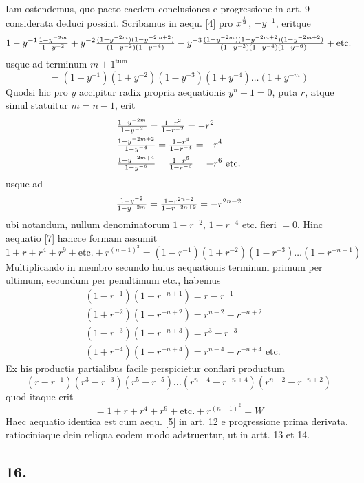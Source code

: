 \documentclass[twoside,12pt]{memoir}
\let\oldfrac\frac
\def\frac#1#2{\mathchoice{\tfrac{#1}{#2}}{\oldfrac{#1}{#2}}{\genfrac{}{}{}{2}{#1}{#2\mathstrut}}{\genfrac{}{}{}{3}{#1}{#2\mathstrut}}}
\begin{document}
Iam ostendemus, quo pacto eaedem conclusiones e progressione in art. 9 considerata deduci possint. Scribamus in aequ. [4] pro \(x^{\frac{1}{2}}\), \(-y^{-1}\), eritque\pagebreak%
\[1-y^{-1} \frac{1-y^{-2 m}}{1-y^{-2}}+y^{-2} \frac{(1-y^{-2 m})(1-y^{-2 m+2})}{(1-y^{-2})(1-y^{-4})}-y^{-3} \frac{(1-y^{-2 m})(1-y^{-2 m+2})(1-y^{-2 m+2})}{(1-y^{-2})(1-y^{-4})(1-y^{-6})}+\text{etc.}\]
usque ad terminum \(m+1^{\text{tum }}\)
\[=(1-y^{-1})(1+y^{-2})(1-y^{-3})(1+y^{-4}) \ldots(1 \pm y^{-m})\tag{7}\]
Quodsi hic pro \(y\) accipitur radix propria aequationis \(y^{n}-1=0\), puta \(r\), atque simul statuitur \(m=n-1\), erit
\[\begin{aligned}
& \frac{1-y^{-2 m}}{1-y^{-2}}=\frac{1-r^{2}}{1-r^{-2}}=-r^{2} \\
& \frac{1-y^{-2 m+2}}{1-y^{-4}}=\frac{1-r^{4}}{1-r^{-4}}=-r^{4} \\
& \frac{1-y^{-2 m+4}}{1-y^{-6}}=\frac{1-r^{6}}{1-r^{-6}}=-r^{6} \text{ etc.}
\end{aligned}\]
usque ad
\[\frac{1-y^{-2}}{1-y^{-2 m}}=\frac{1-r^{2 n-2}}{1-r^{-2 n+2}}=-r^{2 n-2}\]
ubi notandum, nullum denominatorum \(1-r^{-2}\), \(1-r^{-4}\) etc. fieri \(=0\). Hinc aequatio [7] hancce formam assumit
\[1+r+r^{4}+r^{9}+\text{etc.}+r^{(n-1)^{2}}=(1-r^{-1})(1+r^{-2})(1-r^{-3}) \ldots(1+r^{-n+1})\]
Multiplicando in membro secundo huius aequationis terminum primum per ultimum, secundum per penultimum etc., habemus
\[\begin{aligned}
& (1-r^{-1})(1+r^{-n+1})=r-r^{-1} \\
& (1+r^{-2})(1-r^{-n+2})=r^{n-2}-r^{-n+2} \\
& (1-r^{-3})(1+r^{-n+3})=r^{3}-r^{-3} \\
& (1+r^{-4})(1-r^{-n+4})=r^{n-4}-r^{-n+4} \text{ etc.}
\end{aligned}\]
Ex his productis partialibus facile perspicietur conflari productum
\[(r-r^{-1})(r^{3}-r^{-3})(r^{5}-r^{-5}) \ldots(r^{n-4}-r^{-n+4})(r^{n-2}-r^{-n+2})\]
quod itaque erit
\[=1+r+r^{4}+r^{9}+\text{etc.}+r^{(n-1)^{2}}=W\]
Haec aequatio identica est cum aequ. [5] in art. 12 e progressione prima derivata, ratiociniaque dein reliqua eodem modo adstruentur, ut in artt. 13 et 14.\pagebreak%

\subsection*{16.}
 
\end{document}
